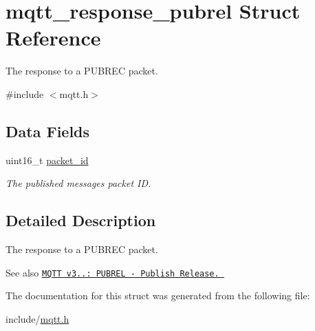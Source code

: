 \hypertarget{structmqtt__response__pubrel}{}\section{mqtt\+\_\+response\+\_\+pubrel Struct Reference}
\label{structmqtt__response__pubrel}


The response to a P\+U\+B\+R\+EC packet.  




{\ttfamily \#include $<$mqtt.\+h$>$}

\subsection*{Data Fields}
\begin{DoxyCompactItemize}
\item 
uint16\+\_\+t \hyperlink{structmqtt__response__pubrel_a2c0bed73df59a6b283f81d4ca2b4e4a1}{packet\+\_\+id}\hypertarget{structmqtt__response__pubrel_a2c0bed73df59a6b283f81d4ca2b4e4a1}{}\label{structmqtt__response__pubrel_a2c0bed73df59a6b283f81d4ca2b4e4a1}

\begin{DoxyCompactList}\small\item\em The published messages packet ID. \end{DoxyCompactList}\end{DoxyCompactItemize}


\subsection{Detailed Description}
The response to a P\+U\+B\+R\+EC packet. 

\begin{DoxySeeAlso}{See also}
\href{http://docs.oasis-open.org/mqtt/mqtt/v3.1.1/os/mqtt-v3.1.1-os.html#_Toc398718053}{\tt M\+Q\+TT v3..\+: P\+U\+B\+R\+EL -\/ Publish Release. } 
\end{DoxySeeAlso}


The documentation for this struct was generated from the following file\+:\begin{DoxyCompactItemize}
\item 
include/\hyperlink{mqtt_8h}{mqtt.\+h}\end{DoxyCompactItemize}
